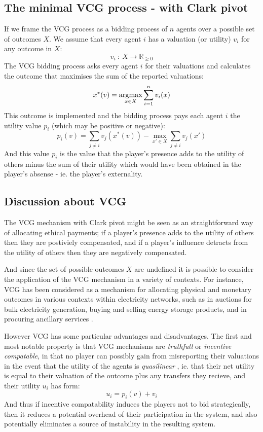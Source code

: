 \subsection{The minimal VCG process - with Clark pivot}
If we frame the VCG process as a bidding process of $n$ agents over a possible set of outcomes $X$.
We assume that every agent $i$ has a valuation (or utility) $v_i$ for any outcome in $X$:
$$ v_i~:~X\rightarrow \mathbb{R}_{\ge 0} $$
The VCG bidding process asks every agent $i$ for their valuations and calculates the outcome that maximises the sum of the reported valuations:
$$ x^*(v) = \operatorname*{\arg\!\max}_{x\in X}\sum_{i=1}^{n}v_i(x) $$
This outcome is implemented and the bidding process pays each agent $i$ the utility value $p_i$ (which may be positive or negative):
\begin{equation}\label{eq:VCG_payment_rule} p_i(v)=\sum_{j\ne i}v_j(x^*(v)) - \max_{x'\in X}\sum_{j\ne i}v_j(x') \end{equation}
And this value $p_i$ is the value that the player's presence adds to the utility of others minus the sum of their utility which would have been obtained in the player's absense - ie. the player's externality.

\subsection{Discussion about VCG}
The VCG mechanism with Clark pivot might be seen as an straightforward way of allocating ethical payments; if a player's presence adds to the utility of others then they are postiviely compensated, and if a player's influence detracts from the utility of others then they are negatively compensated.

And since the set of possible outcomes $X$ are undefined it is possible to consider the application of the VCG mechanism in a variety of contexts.	
For instance, VCG has been considered as a mechanism for allocating physical and monetary outcomes in various contexts within electricity networks, such as in auctions for bulk electricity generation, buying and selling energy storage products, and in procuring ancillary services \cite{FABRA200272, SESSA2017189, 8264596, 7512339}.

However VCG has some particular advantages and disadvantages.
The first and most notable property is that VCG mechanisms are \textit{truthfull} or \textit{incentive compatable}, in that no player can possibly gain from misreporting their valuations
in the event that the utility of the agents is \textit{quasilinear} \cite{roberts1979characterization, Lavi2008}, ie. that their net utility is equal to their valuation of the outcome plus any transfers they recieve, and their utility $u_i$ has form:
$$ u_i = p_i(v)+v_i $$
And thus if incentive compatability induces the players not to bid strategically, then it reduces a potential overhead of their participation in the system, and also potentially eliminates a source of instability in the resulting system.

